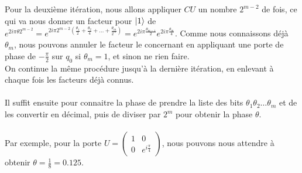 Pour la deuxième itération, nous allons appliquer $CU$ un nombre $2^{m-2}$ de fois, ce qui
va nous donner un facteur pour $\ket{1}$ de $e^{2i\pi\theta2^{m-2}} = e^{2i\pi 2^{m-2}
\left(\frac{\theta_1}{2} + \frac{\theta_2}{4} + \dots + \frac{\theta_m}{2^m}\right)}
= e^{2i\pi \frac{\theta_{m-1}}{2}} e^{2i\pi \frac{\theta_{m}}{4}}$.
Comme nous connaissons déjà $\theta_m$, nous pouvons annuler le facteur le concernant
en appliquant une porte de phase de $-\frac{\pi}{2}$ sur $q_0$ si $\theta_m = 1$, et
sinon ne rien faire.\\
On continue la même procédure jusqu'à la dernière itération, en enlevant à chaque fois
les facteurs déjà connus.\\ \\
Il suffit ensuite pour connaitre la phase de prendre la liste des bits $\theta_1 \theta_2
\dots \theta_m$ et de les convertir en décimal, puis de diviser par $2^m$ pour obtenir
la phase $\theta$.\\ \\
Par exemple, pour la porte $U = \begin{pmatrix} 1 & 0 \\ 0 & e^{i\frac{\pi}{4}} \end{pmatrix}$,
nous pouvons nous attendre à obtenir $\theta = \frac{1}{8} = 0.125$.
